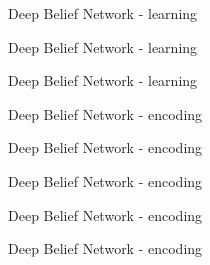 \documentclass{beamer}
\begin{document}
\begin{frame}{Deep Belief Network - learning}
\def\layersep{2.5cm}
  \begin{center}
    
  \end{center}
\end{frame}



\begin{frame}{Deep Belief Network - learning}
\def\layersep{2.5cm}
  \begin{center}
    
  \end{center}
\end{frame}


\begin{frame}{Deep Belief Network - learning}
\def\layersep{2.5cm}
  \begin{center}
    
  \end{center}
\end{frame}

  
\begin{frame}{Deep Belief Network - encoding}
\def\layersep{2.5cm}
  \begin{center}
    
  \end{center}
\end{frame}


\begin{frame}{Deep Belief Network - encoding}
\def\layersep{2.5cm}
  \begin{center}
    
  \end{center}
\end{frame}


\begin{frame}{Deep Belief Network - encoding}
\def\layersep{2.5cm}
  \begin{center}
    
  \end{center}
\end{frame}


\begin{frame}{Deep Belief Network - encoding}
\def\layersep{2.5cm}
  \begin{center}
    
  \end{center}
\end{frame}


\begin{frame}{Deep Belief Network - encoding}
\def\layersep{2.5cm}
  \begin{center}
    
  \end{center}
\end{frame}
\end{document}
